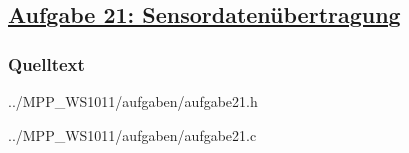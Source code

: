 \subsection*
{\href{http://cst.mi.fu-berlin.de/intern/19606-P-MPP/Aufgaben/040702.html}
{Aufgabe 21: Sensordatenübertragung}}

\subsubsection*{Quelltext}

{../MPP_WS1011/aufgaben/aufgabe21.h}


{../MPP_WS1011/aufgaben/aufgabe21.c}
